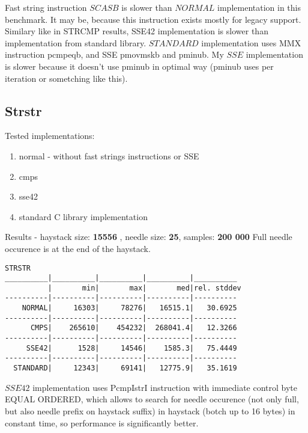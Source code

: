 \documentclass[11pt,a4paper]{article}
\begin{document}
Fast string instruction $SCASB$ is slower than $NORMAL$ implementation in this benchmark.
It may be, because this instruction exists mostly for legacy support.
Similary like in STRCMP results, SSE42 implementation is slower than implementation from standard library.
$STANDARD$ implementation uses MMX instruction pcmpeqb, and SSE pmovmskb and pminub.
My $SSE$ implementation is slower because it doesn't use pminub in optimal way (pminub uses per iteration or sometching like this).


\subsection{Strstr}\label{subsec:strstr}
    Tested implementations:
    \begin{enumerate}
        \item normal - without fast strings instructions or SSE
        \item cmps
        \item sse42
        \item standard C library implementation
    \end{enumerate}
Results - haystack size: \textbf{15556} , needle size: \textbf{25}, samples: \textbf{200 000} \newline
Full needle occurence is at the end of the haystack.
\begin{lstlisting}[]
STRSTR
__________|__________|__________|__________|__________
          |       min|       max|       med|rel. stddev
----------|----------|----------|----------|----------
    NORMAL|     16303|     78276|   16515.1|   30.6925
----------|----------|----------|----------|----------
      CMPS|    265610|    454232|  268041.4|   12.3266
----------|----------|----------|----------|----------
     SSE42|      1528|     14546|    1585.3|   75.4449
----------|----------|----------|----------|----------
  STANDARD|     12343|     69141|   12775.9|   35.1619
\end{lstlisting}
$SSE42$ implementation uses PcmpIstrI instruction with immediate control byte EQUAL ORDERED, which allows to search for needle occurence (not only full, but also needle prefix on haystack suffix) in haystack (botch up to 16 bytes) in constant time, so performance is significantly better.
\end{document}
